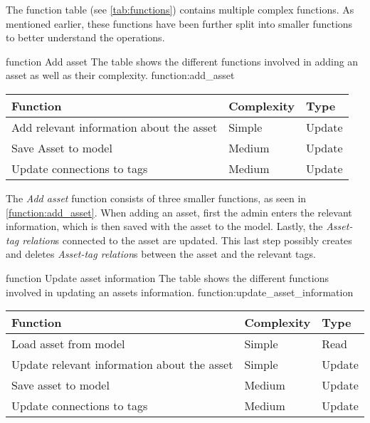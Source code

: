 The function table (see \autoref{tab:functions}) contains multiple complex functions. As mentioned earlier, these functions have been further split into smaller functions to better understand the operations.


\fancyLayout
    {function}
    {Add asset}
    {The table shows the different functions involved in adding an asset as well as their complexity.}
    {function:add_asset}
    {
        \centering
        \begin{tabular}{|l|l|l|}
            \hline
            \textbf{Function} & \textbf{Complexity} & \textbf{Type}\\
            \hline
            \hline
            Add relevant information about the asset & Simple & Update \\
            \hline
            Save Asset to model & Medium & Update \\
            \hline
            Update connections to tags & Medium & Update\\
            \hline
        \end{tabular}
}

The \textit{Add asset} function consists of three smaller functions, as seen in \autoref{function:add_asset}. When adding an asset, first the admin enters the relevant information, which is then saved with the asset to the model. Lastly, the \textit{Asset-tag relation}s connected to the asset are updated. This last step possibly creates and deletes \textit{Asset-tag relation}s between the asset and the relevant tags.

\fancyLayout
    {function}
    {Update asset information}
    {The table shows the different functions involved in updating an assets information.}
    {function:update_asset_information}
    {
        \centering
        \begin{tabular}{|l|l|l|}
            \hline
            \textbf{Function} & \textbf{Complexity} & \textbf{Type}\\
            \hline
            \hline
            Load asset from model & Simple & Read \\
            \hline
            Update relevant information about the asset & Simple & Update \\
            \hline
            Save asset to model & Medium & Update \\
            \hline
            Update connections to tags & Medium & Update\\
            \hline
        \end{tabular}
}

